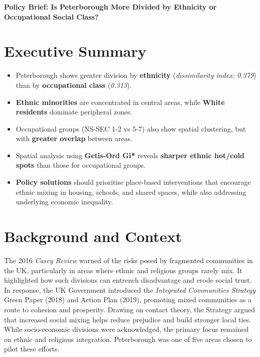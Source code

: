 \documentclass[10pt]{article}
\begin{document}
	
	\begin{center}
		\LARGE\textbf{Policy Brief: Is Peterborough More Divided by Ethnicity or Occupational Social Class?}
	\end{center}
	
	\begin{multicols}{2}
	
	\section*{Executive Summary}
	
	\begin{tcolorbox}
	\begin{itemize} [left=0.3em, labelsep=0.5em, labelwidth=0.6em, itemsep=0pt, topsep=0pt]
		\item Peterborough shows greater division by \textbf{ethnicity} (\textit{dissimilarity index: 0.379}) than by \textbf{occupational class} (\textit{0.313}).
		\item \textbf{Ethnic minorities} are concentrated in central areas, while \textbf{White residents} dominate peripheral zones.
		\item Occupational groups (NS-SEC 1-2 vs 5-7) also show spatial clustering, but with \textbf{greater overlap} between areas.
		\item Spatial analysis using \textbf{Getis-Ord Gi*} reveals \textbf{sharper ethnic hot/cold spots} than those for occupational groups.
		\item \textbf{Policy solutions} should prioritise place-based interventions that encourage ethnic mixing in housing, schools, and shared spaces, while also addressing underlying economic inequality.
	\end{itemize}
	\end{tcolorbox}
	
	\vspace{0em}

	\section*{Background and Context}
	\indent The 2016 \textit{Casey Review} warned of the risks posed by fragmented communities in the UK, particularly in areas where ethnic and religious groups rarely mix. It highlighted how such divisions can entrench disadvantage and erode social trust. In response, the UK Government introduced the \textit{Integrated Communities Strategy} Green Paper (2018) and Action Plan (2019), promoting mixed communities as a route to cohesion and prosperity. Drawing on contact theory, the Strategy argued that increased social mixing helps reduce prejudice and build stronger local ties. While socio-economic divisions were acknowledged, the primary focus remained on ethnic and religious integration. Peterborough was one of five areas chosen to pilot these efforts.
	

\end{multicols}
\end{document}
